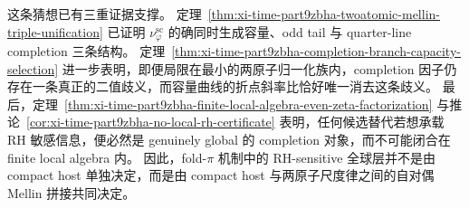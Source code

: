 \noindent
这条猜想已有三重证据支撑。
定理~\ref{thm:xi-time-part9zbha-twoatomic-mellin-triple-unification} 已证明 \(\nu_\varphi^{\mathrm{sc}}\) 的确同时生成容量、odd tail 与 quarter-line completion 三条结构。
定理~\ref{thm:xi-time-part9zbha-completion-branch-capacity-selection} 进一步表明，即便局限在最小的两原子归一化族内，completion 因子仍存在一条真正的二值歧义，而容量曲线的折点斜率比恰好唯一消去这条歧义。
最后，定理~\ref{thm:xi-time-part9zbha-finite-local-algebra-even-zeta-factorization} 与推论~\ref{cor:xi-time-part9zbha-no-local-rh-certificate} 表明，任何候选替代若想承载 RH 敏感信息，便必然是 genuinely global 的 completion 对象，而不可能闭合在 finite local algebra 内。
因此，fold-\(\pi\) 机制中的 RH-sensitive 全球层并不是由 compact host 单独决定，而是由 compact host 与两原子尺度律之间的自对偶 Mellin 拼接共同决定。

\endinput
